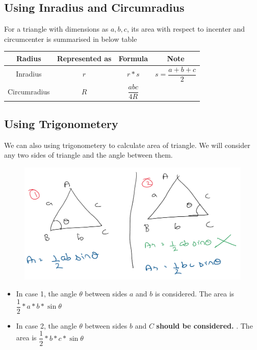 \subsection{Using Inradius and Circumradius}

For a triangle with dimensions as $a,b,c$, its area with respect to incenter and circumcenter is summarised in below table

\begin{table}[h!]
    \centering
    \begin{tabular}{|| c | c | c | c ||}
        \hline
         Radius & Represented as & Formula & Note \\
        \hline
         Inradius & $r$ & $r * s$ & $s = \dfrac{a + b + c}{2}$ \\
        \hline
         Circumradius & $R$ & $\dfrac{abc}{4R}$ & \\
        \hline
    \end{tabular}
\end{table}

\subsection{Using Trigonometery}
We can also using trigonometery to calculate area of triangle. We will consider any two sides of triangle and the angle between them. 

\begin{figure}[h!]
    \centering
    \includegraphics[width=0.9\linewidth]{Quant//Geometry//Images//Triangles/area_trigo.png}
\end{figure}

\begin{itemize}
    \item In case 1, the angle $\theta$ between sides $a$ and $b$ is considered. The area is $\dfrac{1}{2} * a * b * \sin{\theta} $

    \item In case 2, the angle $\theta$ between sides $b$ and $C$ \textbf{should be considered.} . The area is $\dfrac{1}{2} * b * c * \sin{\theta} $
    
\end{itemize}


